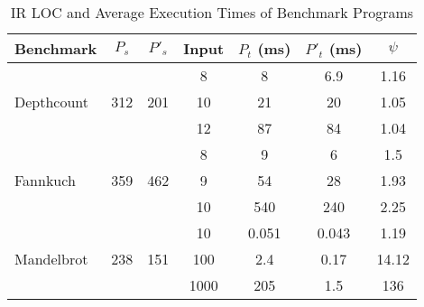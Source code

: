 \begin{table}[htbp]
\small{
\begin{center}
    \begin{tabular}{|p{1.4cm}|c|c|c|c|c|c|}
    \hline
    \textbf{Benchmark} & \textbf{$P_s$} & \textbf{$P'_s$} &  \textbf{Input} & \textbf{$P_t$ (ms)} & \textbf{$P'_t$ (ms)} & $\psi$ \\ \hline
    \multirow{3}{*}{Depthcount}
    & & & 8 & 8 & 6.9 & 1.16\\
	& 312 & 201 & 10 & 21 & 20 & 1.05 \\
 	& & & 12 & 87 & 84 & 1.04 \\ \hline
 	\multirow{3}{*}{Fannkuch}
    & & & 8 & 9 & 6 & 1.5\\
	& 359 & 462 & 9 & 54 & 28 & 1.93 \\
 	& & & 10 & 540 & 240 & 2.25 \\ \hline
 	\multirow{3}{*}{Mandelbrot}
    & & & 10 & 0.051 & 0.043 & 1.19\\
	& 238 & 151 & 100 & 2.4 & 0.17 & 14.12 \\
 	& & & 1000 & 205 & 1.5 & 136 \\ \hline
    \hline
    \end{tabular}
    \end{center}
    }
    \caption{IR LOC and Average Execution Times of Benchmark Programs}
    \label{tab:benchmarks}
\end{table}


